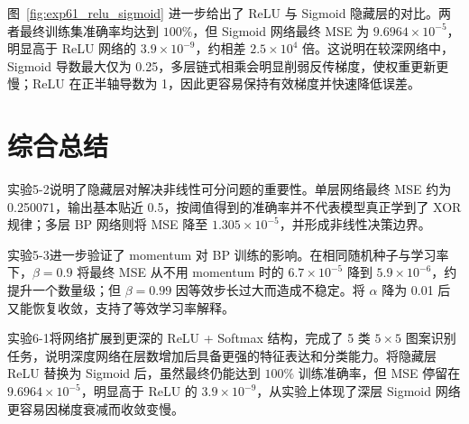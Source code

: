 \documentclass[10.5pt]{config}
\begin{document}
图~\ref{fig:exp61_relu_sigmoid} 进一步给出了 ReLU 与 Sigmoid 隐藏层的对比。两者最终训练集准确率均达到 $100\%$，但 Sigmoid 网络最终 MSE 为 $9.6964\times10^{-5}$，明显高于 ReLU 网络的 $3.9\times10^{-9}$，约相差 $2.5\times10^4$ 倍。这说明在较深网络中，Sigmoid 导数最大仅为 0.25，多层链式相乘会明显削弱反传梯度，使权重更新更慢；ReLU 在正半轴导数为 1，因此更容易保持有效梯度并快速降低误差。

\section{综合总结}

实验5-2说明了隐藏层对解决非线性可分问题的重要性。单层网络最终 MSE 约为 0.250071，输出基本贴近 0.5，按阈值得到的准确率并不代表模型真正学到了 XOR 规律；多层 BP 网络则将 MSE 降至 $1.305\times10^{-5}$，并形成非线性决策边界。

实验5-3进一步验证了 momentum 对 BP 训练的影响。在相同随机种子与学习率下，$\beta=0.9$ 将最终 MSE 从不用 momentum 时的 $6.7\times10^{-5}$ 降到 $5.9\times10^{-6}$，约提升一个数量级；但 $\beta=0.99$ 因等效步长过大而造成不稳定。将 $\alpha$ 降为 0.01 后又能恢复收敛，支持了等效学习率解释。

实验6-1将网络扩展到更深的 ReLU + Softmax 结构，完成了 5 类 $5\times5$ 图案识别任务，说明深度网络在层数增加后具备更强的特征表达和分类能力。将隐藏层 ReLU 替换为 Sigmoid 后，虽然最终仍能达到 $100\%$ 训练准确率，但 MSE 停留在 $9.6964\times10^{-5}$，明显高于 ReLU 的 $3.9\times10^{-9}$，从实验上体现了深层 Sigmoid 网络更容易因梯度衰减而收敛变慢。
\end{document}
